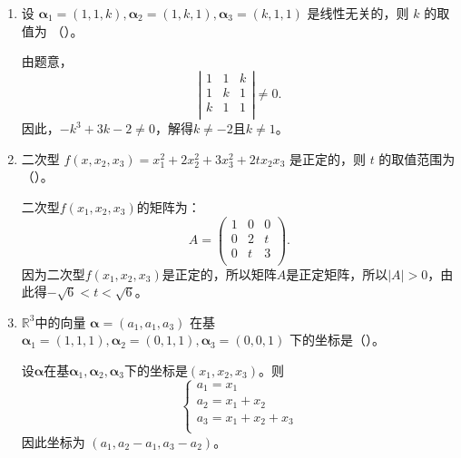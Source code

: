 \begin{enumerate}[1~]
\begin{enumerate}[1.~]
\begin{solution}
\end{solution}

\item
设 $\boldsymbol{\alpha} _ { 1 } = ( 1, 1, k ) , \boldsymbol{\alpha} _ { 2 } = ( 1 , k , 1 ) , \boldsymbol{\alpha} _ { 3 } = ( k, 1, 1 )$ 是线性无关的，则 $k$ 的取值为 （\quad）。
\begin{solution}
由题意，\[
\left| \begin{matrix}
	1&		1&		k\\
	1&		k&		1\\
	k&		1&		1\\
\end{matrix} \right|\ne 0.
\]
因此，$-k^3+3k-2\ne 0$，解得$k\ne -2$且$k\ne 1$。
\end{solution}

\item
二次型 $f \left( x , x _ { 2 } , x _ { 3 } \right) = x _ { 1 } ^ { 2 } + 2 x _ { 2 } ^ { 2 } + 3 x _ { 3 } ^ { 2 } + 2 t x _ { 2 } x _ { 3 }$ 是正定的，则 $t$ 的取值范围为（\quad）。
\begin{solution}
二次型$f(x_1, x_2, x_3)$的矩阵为：\[
A=\left( \begin{matrix}
	1&		0&		0\\
	0&		2&		t\\
	0&		t&		3\\
\end{matrix} \right) .
\]
因为二次型$f(x_1, x_2, x_3)$是正定的，所以矩阵$A$是正定矩阵，所以$|A|>0$，由此得$-\sqrt{6}<t<\sqrt{6}$。
\end{solution}

\item
$\mathbb{R}^3$中的向量 $\boldsymbol{\alpha} = \left( a _ { 1 } , a _ { 1 } , a _ { 3 } \right)$ 在基 $\boldsymbol{\alpha} _ { 1 } = ( 1, 1, 1 ) , \boldsymbol{\alpha} _ { 2 } = ( 0, 1, 1 ) , \boldsymbol{\alpha} _ { 3 } = ( 0, 0, 1 )$ 下的坐标是（\quad）。

\begin{solution}
设$\boldsymbol{\alpha}$在基$\boldsymbol{\alpha}_1, \boldsymbol{\alpha}_2, \boldsymbol{\alpha}_3$下的坐标是$(x_1, x_2, x_3)$。则\[
\left\{ \begin{array}{l}
	a_1=x_1\\
	a_2=x_1+x_2\\
	a_3=x_1+x_2+x_3\\
\end{array} \right. 
\]
因此坐标为 $(a_1, a_2-a_1, a_3-a_2)$。
\end{solution}


\end{enumerate}
\end{enumerate}
